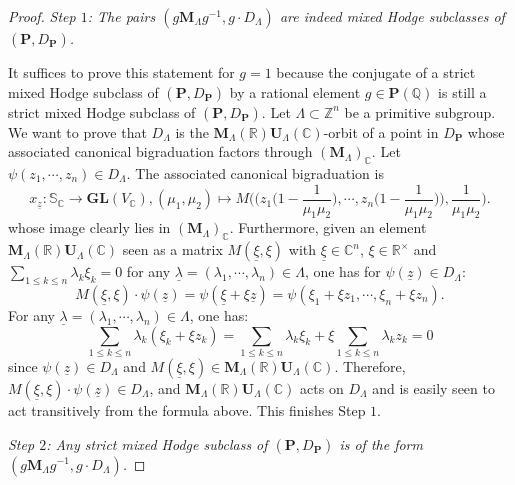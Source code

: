 \documentclass[10pt]{article}
\numberwithin{equation}{subsection}
\theoremstyle{plain}
\theoremstyle{definition}
\theoremstyle{remark}
\newcommand{\Z}{\mathbb Z}
\newcommand{\Q}{\mathbb Q}
\newcommand{\C}{\mathbb C}
\newcommand{\R}{\mathbb R}
\newcommand{\s}{\mathbb S}
\newcommand{\pp}{\mathbf P}
\newcommand{\uu}{\mathbf U}
\newcommand{\M}{\mathbf M}
\newcommand{\gl}{\mathbf{GL}}
\newcommand{\zz}{\underline{z}}
\newcommand{\xxi}{\underline{\xi}}
\newcommand{\lambdaa}{\underline{\lambda}}
\begin{document}
\begin{proof}
\textit{Step $1$: The pairs $(g \M_{\Lambda} g^{-1}, g \cdot D_{\Lambda})$ are indeed mixed Hodge subclasses of $(\pp, D_\pp)$.}

It suffices to prove this statement for $g = 1$ because the conjugate of a strict mixed Hodge subclass of $(\pp, D_\pp)$ by a rational element $g \in \pp(\Q)$ is still a strict mixed Hodge subclass of $(\pp,D_\pp)$. Let $\Lambda \subset \Z^n$ be a primitive subgroup. We want to prove that $D_{\Lambda}$ is the $\M_{\Lambda}(\R)\uu_{\Lambda}(\C)$-orbit of a point in $D_\pp$ whose associated canonical bigraduation factors through $(\M_{\Lambda})_\C$. Let $\psi(z_1, \cdots, z_n) \in D_{\Lambda}$. The associated canonical bigraduation is
\[
x_{\zz} : \s_\C \rightarrow \gl(V_\C), (\mu_1, \mu_2) \mapsto M\Big(\big(z_1\big(1- \frac{1}{\mu_1 \mu_2}\big), \cdots, z_n\big(1- \frac{1}{\mu_1 \mu_2}\big) \big), \frac{1}{\mu_1 \mu_2}\Big) .
\]
whose image clearly lies in $(\M_{\Lambda})_\C$. Furthermore, given an element $\M_{\Lambda}(\R)\uu_{\Lambda}(\C)$ seen as a matrix $M(\xxi, \xi)$ with $\xxi \in \C^n$, $\xi \in \R^\times$ and $ \sum_{1 \leqslant k \leqslant n} \lambda_k \xi_k  = 0$ for any $\lambdaa = (\lambda_1, \cdots, \lambda_n) \in \Lambda$, one has for $\psi(\zz) \in D_{\Lambda}$:
\[
M(\xxi, \xi) \cdot \psi(\zz) = \psi(\xxi + \xi \zz) = \psi(\xi_1 + \xi z_1, \cdots, \xi_n + \xi z_n).
\]
For any $\lambdaa = (\lambda_1, \cdots, \lambda_n) \in \Lambda$, one has:
\[
\sum_{1 \leqslant k \leqslant n} \lambda_k (\xi_k + \xi z_k) = \sum_{1 \leqslant k \leqslant n} \lambda_k \xi_k + \xi \sum_{1 \leqslant k \leqslant n}\lambda_k z_k = 0
\]
since $\psi(\zz) \in D_{\Lambda}$ and $M(\xxi, \xi) \in \M_{\Lambda}(\R)\uu_{\Lambda}(\C)$. Therefore, $M(\xxi, \xi) \cdot \psi(\zz) \in D_{\Lambda}$, and $\M_{\Lambda}(\R)\uu_{\Lambda}(\C)$ acts on $D_{\Lambda}$ and is easily seen to act transitively from the formula above. This finishes Step $1$.

\noindent \textit{Step $2$: Any strict mixed Hodge subclass of $(\pp, D_\pp)$ is of the form $(g \M_{\Lambda} g^{-1}, g \cdot D_{\Lambda})$.}


\end{proof}
\end{document}
